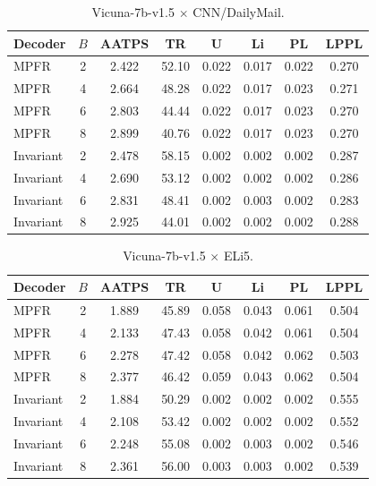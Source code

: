 \documentclass{article}
\theoremstyle{plain}
\theoremstyle{definition}
\begin{document}
\begin{table}[h]
\centering
\small
\caption{Vicuna-7b-v1.5 $\times$ CNN/DailyMail.}
\label{tab:full-vicuna-cnn}
\begin{tabular}{l c c c c c c c}
\toprule
Decoder & $B$ & AATPS & TR & U & Li & PL & LPPL \\
\midrule
MPFR      & 2 & 2.422 & 52.10 & 0.022 & 0.017 & 0.022 & 0.270 \\
MPFR      & 4 & 2.664 & 48.28 & 0.022 & 0.017 & 0.023 & 0.271 \\
MPFR      & 6 & 2.803 & 44.44 & 0.022 & 0.017 & 0.023 & 0.270 \\
MPFR      & 8 & 2.899 & 40.76 & 0.022 & 0.017 & 0.023 & 0.270 \\
Invariant & 2 & 2.478 & 58.15 & 0.002 & 0.002 & 0.002 & 0.287 \\
Invariant & 4 & 2.690 & 53.12 & 0.002 & 0.002 & 0.002 & 0.286 \\
Invariant & 6 & 2.831 & 48.41 & 0.002 & 0.003 & 0.002 & 0.283 \\
Invariant & 8 & 2.925 & 44.01 & 0.002 & 0.002 & 0.002 & 0.288 \\
\bottomrule
\end{tabular}
\end{table}

\begin{table}[!htbp]
\centering
\small
\caption{Vicuna-7b-v1.5 $\times$ ELi5.}
\label{tab:full-vicuna-eli5}
\begin{tabular}{l c c c c c c c}
\toprule
Decoder & $B$ & AATPS & TR & U & Li & PL & LPPL \\
\midrule
MPFR      & 2 & 1.889 & 45.89 & 0.058 & 0.043 & 0.061 & 0.504 \\
MPFR      & 4 & 2.133 & 47.43 & 0.058 & 0.042 & 0.061 & 0.504 \\
MPFR      & 6 & 2.278 & 47.42 & 0.058 & 0.042 & 0.062 & 0.503 \\
MPFR      & 8 & 2.377 & 46.42 & 0.059 & 0.043 & 0.062 & 0.504 \\
Invariant & 2 & 1.884 & 50.29 & 0.002 & 0.002 & 0.002 & 0.555 \\
Invariant & 4 & 2.108 & 53.42 & 0.002 & 0.002 & 0.002 & 0.552 \\
Invariant & 6 & 2.248 & 55.08 & 0.002 & 0.003 & 0.002 & 0.546 \\
Invariant & 8 & 2.361 & 56.00 & 0.003 & 0.003 & 0.002 & 0.539 \\
\bottomrule
\end{tabular}
\end{table}
\end{document}
